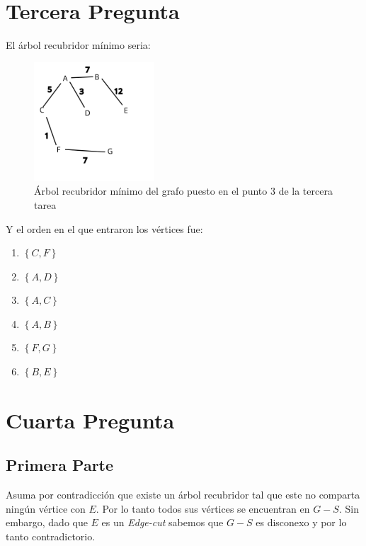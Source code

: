     
    \section*{Tercera Pregunta}

    El árbol recubridor mínimo seria:

    \begin{figure}[H]
      \centering
      \includegraphics[width=0.4\textwidth]{Imagenes/grafo1.png}
      \caption{Árbol recubridor mínimo del grafo puesto en el punto 3 de la tercera tarea}
      \label{fig:grafo1}
    \end{figure}

    Y el orden en el que entraron los vértices fue:
    \begin{enumerate}
      \item $\left\{ C, F \right\} $ 
      \item $\left\{ A,D \right\} $ 
      \item $\left\{ A,C \right\} $ 
      \item $\left\{ A,B \right\} $ 
      \item $\left\{ F,G \right\} $ 
      \item $\left\{ B,E \right\} $
    \end{enumerate}

    \section*{Cuarta Pregunta}
    \subsection*{Primera Parte}

    Asuma por contradicción que existe un árbol recubridor tal que este no comparta ningún vértice con $E$. Por lo tanto todos sus vértices se encuentran en $G-S$. Sin embargo, dado que $E$ es un \textit{Edge-cut} sabemos que  $G-S$ es disconexo y por lo tanto contradictorio.

